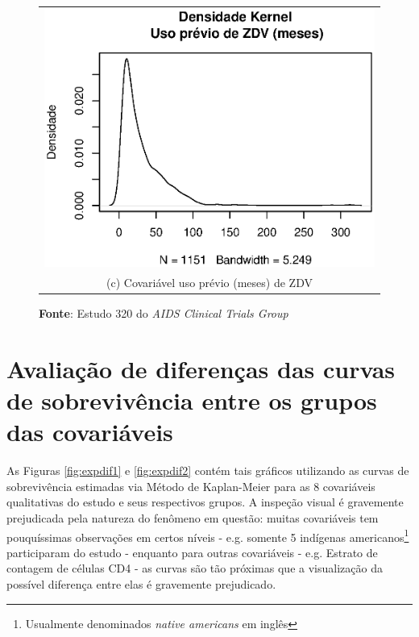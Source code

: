 \documentclass[
	12pt,				%
	openright,			%
	twoside,			%
	a4paper,			%
	english,			%
	brazil				%
	]{abntex2}
\begin{document}
\begin{figure}[!ht]
\begin{tabular}{c}
 \includegraphics[scale = 0.6]{Rplot13}\\
(c) Covariável uso prévio (meses) de ZDV\\[6pt]
  \end{tabular}
      \caption*{\tiny{\textbf{Fonte}: Estudo 320 do \textit{AIDS Clinical Trials Group}}}
\end{figure}

\section{Avaliação de diferenças das curvas de sobrevivência entre os grupos das covariáveis}

As Figuras \ref{fig:expdif1} e \ref{fig:expdif2} contém tais gráficos utilizando as curvas de sobrevivência estimadas via Método de Kaplan-Meier para as 8 covariáveis qualitativas do estudo e seus respectivos grupos. A inspeção visual é gravemente prejudicada pela natureza do fenômeno em questão: muitas covariáveis tem pouquíssimas observações em certos níveis - e.g. somente 5 indígenas americanos\footnote{Usualmente denominados \textit{native americans} em inglês} participaram do estudo - enquanto para outras covariáveis - e.g. Estrato de contagem de células CD4 - as curvas são tão próximas que a visualização da possível diferença entre elas é gravemente prejudicado.
\end{document}
